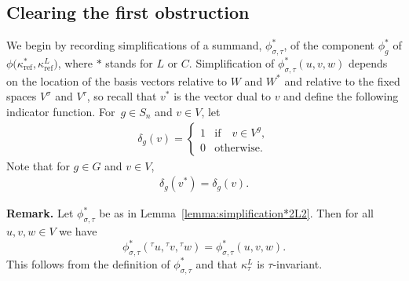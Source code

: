 \documentclass[pdftex]{sigma}
\numberwithin{equation}{section}
\newcommand{\actbylessspace}[1]{{}^{#1}\!}
\DeclareMathOperator{\refl}{ref}
\begin{document}
\subsection{Clearing the first obstruction}%

We begin by recording simplifications of a summand, $\phi^{*}_{\sigma,\tau}$,
of the component $\phi_{g}^{*}$ of $\phi\big(\kappa^{*}_{\refl},\kappa^L_{\refl}\big)$,
where $*$ stands for $L$ or $C$.
Simplification of $\phi^{*}_{\sigma,\tau}(u,v,w)$ depends on
the location of the basis vectors relative to $W$ and $W^*$ and relative to
the fixed spaces $V^{\sigma}$ and $V^{\tau}$, so recall that $v^*$ is the
vector dual to $v$ and define the following indicator function. For~$g \in S_n$ and $v \in V$, let
\begin{gather*}
\delta_g(v)=\begin{cases}
1 & \text{if}\quad v \in V^{g}, \\
0 & \text{otherwise}.
\end{cases}
\end{gather*}
Note that for $g \in G$ and $v \in V$,
\begin{gather*}
\delta_g(v^*)=\delta_g(v).
\end{gather*}

\noindent\textbf{Remark.}
Let $\phi^*_{\sigma,\tau}$ be as in Lemma~\ref{lemma:simplification*2L2}.
Then for all $u,v,w \in V$ we have
\begin{equation}
\label{tauinv}
\phi^*_{\sigma,\tau}(\actbylessspace{\tau}u,\actbylessspace{\tau}v,\actbylessspace{\tau}w)
=\phi^*_{\sigma,\tau}(u,v,w).
\end{equation}
This follows from the definition of $\phi^*_{\sigma,\tau}$ and that $\kappa^L_{\tau}$
is $\tau$-invariant.
\end{document}
